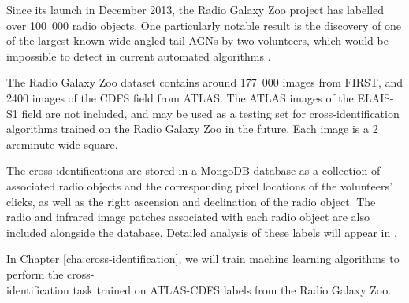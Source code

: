     Since its launch in December 2013, the Radio Galaxy Zoo project has labelled
    over 100~000 radio objects. One particularly notable result is the discovery
    of one of the largest known wide-angled tail AGNs by two volunteers, which
    would be impossible to detect in current automated algorithms
    \citep{banfield16}.

    The Radio Galaxy Zoo dataset contains around 177~000 images from FIRST, and
    2400 images of the CDFS field from ATLAS. The ATLAS images of the ELAIS-S1
    field are not included, and may be used as a testing set for
    cross-identification algorithms trained on the Radio Galaxy Zoo in the
    future. Each image is a 2 arcminute-wide square.

    The cross-identifications are stored in a MongoDB database as a collection
    of associated radio objects and the corresponding pixel locations of the
    volunteers' clicks, as well as the right ascension and declination of the
    radio object. The radio and infrared image patches associated with each
    radio object are also included alongside the database. Detailed analysis of
    these labels will appear in \citet{atlas-ml}.

    In Chapter \ref{cha:cross-identification}, we will train machine learning
    algorithms to perform the cross-\\identification task trained on ATLAS-CDFS
    labels from the Radio Galaxy Zoo.



